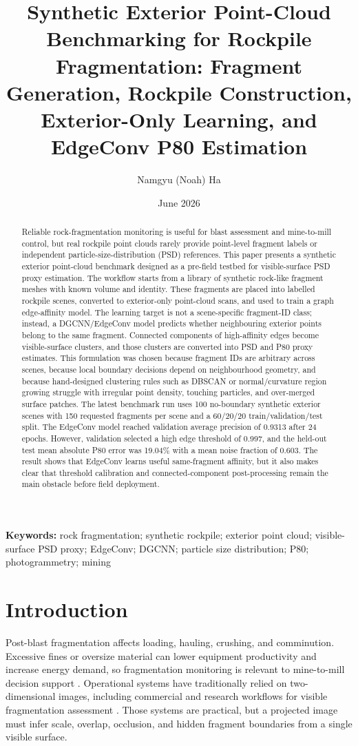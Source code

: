 \documentclass[11pt]{article}
\title{Synthetic Exterior Point-Cloud Benchmarking for Rockpile Fragmentation: Fragment Generation, Rockpile Construction, Exterior-Only Learning, and EdgeConv P80 Estimation}
\author[1]{Namgyu (Noah) Ha}
\affil[1]{Department of Energy and Resources Engineering, National Korea Maritime and Ocean University, Busan, Republic of Korea}
\date{June 2026}
\begin{document}
\maketitle

\begin{abstract}
Reliable rock-fragmentation monitoring is useful for blast assessment and mine-to-mill control, but real rockpile point clouds rarely provide point-level fragment labels or independent particle-size-distribution (PSD) references. This paper presents a synthetic exterior point-cloud benchmark designed as a pre-field testbed for visible-surface PSD proxy estimation. The workflow starts from a library of synthetic rock-like fragment meshes with known volume and identity. These fragments are placed into labelled rockpile scenes, converted to exterior-only point-cloud scans, and used to train a graph edge-affinity model. The learning target is not a scene-specific fragment-ID class; instead, a DGCNN/EdgeConv model predicts whether neighbouring exterior points belong to the same fragment. Connected components of high-affinity edges become visible-surface clusters, and those clusters are converted into PSD and P80 proxy estimates. This formulation was chosen because fragment IDs are arbitrary across scenes, because local boundary decisions depend on neighbourhood geometry, and because hand-designed clustering rules such as DBSCAN or normal/curvature region growing struggle with irregular point density, touching particles, and over-merged surface patches. The latest benchmark run uses 100 no-boundary synthetic exterior scenes with 150 requested fragments per scene and a 60/20/20 train/validation/test split. The EdgeConv model reached validation average precision of 0.9313 after 24 epochs. However, validation selected a high edge threshold of 0.997, and the held-out test mean absolute P80 error was 19.04\% with a mean noise fraction of 0.603. The result shows that EdgeConv learns useful same-fragment affinity, but it also makes clear that threshold calibration and connected-component post-processing remain the main obstacle before field deployment.
\end{abstract}

\textbf{Keywords:} rock fragmentation; synthetic rockpile; exterior point cloud; visible-surface PSD proxy; EdgeConv; DGCNN; particle size distribution; P80; photogrammetry; mining

\section{Introduction}
Post-blast fragmentation affects loading, hauling, crushing, and comminution. Excessive fines or oversize material can lower equipment productivity and increase energy demand, so fragmentation monitoring is relevant to mine-to-mill decision support \cite{cunningham1983,ouchterlony2005}. Operational systems have traditionally relied on two-dimensional images, including commercial and research workflows for visible fragmentation assessment \cite{palangio1995,siddiqui2009}. Those systems are practical, but a projected image must infer scale, overlap, occlusion, and hidden fragment boundaries from a single visible surface.
\end{document}
